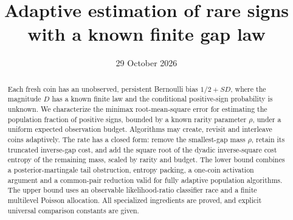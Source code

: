 \documentclass[11pt,a4paper]{article}
\title{\bfseries Adaptive estimation of rare signs\\with a known finite gap law}
\author{}
\date{29 October 2026}
\theoremstyle{remark}
\newcommand{\1}{\mathbf 1}
\begin{document}
\maketitle
\begin{abstract}
Each fresh coin has an unobserved, persistent Bernoulli bias
$1/2+SD$, where the magnitude $D$ has a known finite law and the
conditional positive-sign probability is unknown. We characterize the
minimax root-mean-square error for estimating the population fraction
of positive signs, bounded by a known rarity parameter $\rho$, under a
uniform expected observation budget. Algorithms may create, revisit
and interleave coins adaptively. The rate has a closed form: remove
the smallest-gap mass $\rho$, retain its truncated inverse-gap cost,
and add the square root of the dyadic inverse-square cost entropy
of the remaining mass, scaled by rarity and budget. The lower bound
combines a posterior-martingale tail obstruction, entropy packing,
a one-coin activation argument and a common-pair reduction valid for
fully adaptive population algorithms. The upper bound uses an
observable likelihood-ratio classifier race and a finite multilevel
Poisson allocation. All specialized ingredients are proved, and
explicit universal comparison constants are given.
\end{abstract}






\clearpage
\appendix




\end{document}
